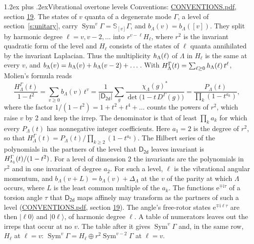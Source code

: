 \documentclass[10pt,a4paper]{article}
\makeatletter
\renewcommand\section{\@startsection{section}{1}{\z@}{-3ex plus -1ex minus -.2ex}%
  {1.2ex plus .2ex}{\normalfont\large\sffamily\bfseries\color{parttitle}}}
\numberwithin{equation}{section}
\newcommand{\grp}[1]{\mathsf{#1}}
\newcommand{\irr}[1]{\text{\normalfont\scshape #1}}
\newcommand{\iunit}{\mathrm{i}}
\newcommand{\expe}{\mathrm{e}}
\newcommand{\repD}[1]{D^{#1}}
\newcommand{\irchar}[1]{\chi_{#1}}
\newcommand{\conj}[1]{{#1}^{*}}
\newcommand{\schur}[1]{\mathbb{S}_{#1}}
\newcommand{\shape}[1]{[#1]}
\newcommand{\occ}[1]{\lvert #1\rangle}
\makeatother
\begin{document}
\section{Vibrational overtone levels}\label{s:overtones}
Conventions: \href{../../CONVENTIONS.pdf}{CONVENTIONS.pdf}, section \href{../../CONVENTIONS.pdf\#conv.19}{19}.
\leavevmode\label{n:index.quanta}\label{n:operator.symmetric.power}The states of $v$ quanta of a degenerate mode $\Gamma$, a level of section~\ref{s:unitary}, carry $\operatorname{Sym}^{v}\Gamma = \schur{\shape{v}}\Gamma$, and $b_\Lambda(v) = b_\Lambda(\shape{v})$. \label{n:local.quadratic.form}\label{n:set.harmonic}They split by harmonic degree $\ell = v, v - 2, \dots$ into $r^{v-\ell}H_\ell$, where $r^2$ is the invariant quadratic form of the level and $H_\ell$ consists of the states of $\ell$ quanta annihilated by the invariant Laplacian. \label{n:function.multiplicity.harmonic}Thus the multiplicity $\mathnormal{h}_\Lambda(\ell)$ of $\Lambda$ in $H_\ell$ is the same at every $v$, and $b_\Lambda(v) = \mathnormal{h}_\Lambda(v) + \mathnormal{h}_\Lambda(v - 2) + \dots$. \label{n:function.generating.level}With $H^{\Gamma}_\Lambda(t) = \sum_{\ell\ge0} \mathnormal{h}_\Lambda(\ell)\,t^{\ell}$, Molien's formula reads
\begin{equation}\label{e:molien}\frac{H^{\Gamma}_\Lambda(t)}{1 - t^2} = \sum_{v\ge0} b_\Lambda(v)\,t^v = \frac{1}{|\grp{D_{2d}}|}\sum_{g}\frac{\conj{\irchar{\Lambda}(g)}}{\det\bigl(1 - t\,\repD{\Gamma}(g)\bigr)} = \frac{P_\Lambda(t)}{\prod_k (1-t^{a_k})},\end{equation}
where the factor $1/(1 - t^2) = 1 + t^2 + t^4 + \dots$ counts the powers of $r^2$, which raise $v$ by 2 and keep the irrep. The denominator is that of least $\prod_k a_k$ for which every $P_\Lambda(t)$ has nonnegative integer coefficients. Here $a_1 = 2$ is the degree of $r^2$, so that $H^{\Gamma}_\Lambda(t) = P_\Lambda(t)/\prod_{k\ge2}(1 - t^{a_k})$. The Hilbert series of the polynomials in the partners of the level that $\grp{D_{2d}}$ leaves invariant is $H^{\Gamma}_{\irr{a}_{1}}(t)/(1 - t^2)$. For a level of dimension 2 the invariants are the polynomials in $r^2$ and in one invariant of degree $a_2$. \label{n:index.overtone.period}\label{n:index.increment.unitary}For such a level, $\ell$ is the vibrational angular momentum, and $b_\Lambda(v + L) = b_\Lambda(v) + \Delta_\Lambda$ at the $v$ of the parity at which $\Lambda$ occurs, where $L$ is the least common multiple of the $a_k$. \label{n:local.torsion.angle}The functions $\expe^{\mp\iunit\tau}$ of a torsion angle $\tau$ that $\grp{D_{2d}}$ maps affinely may transform as the partners of such a level (\href{../../CONVENTIONS.pdf}{CONVENTIONS.pdf}, section \href{../../CONVENTIONS.pdf\#conv.19}{19}). The angle's free-rotor states $\expe^{\mp\iunit\ell\tau}$ are then $\occ{\ell 0}$ and $\occ{0 \ell}$, of harmonic degree $\ell$. A table of numerators leaves out the irreps that occur at no $v$. The table after it gives $\operatorname{Sym}^{v}\Gamma$ and, in the same row, $H_\ell$ at $\ell = v$: $\operatorname{Sym}^{v}\Gamma = H_\ell \oplus r^2\operatorname{Sym}^{v-2}\Gamma$ at $\ell = v$.
\end{document}
